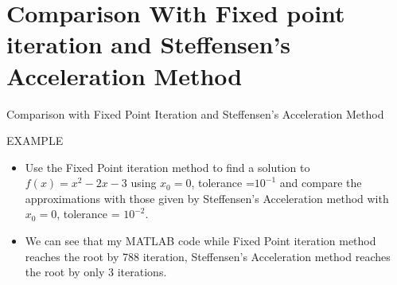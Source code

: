 \documentclass{beamer}
\begin{document}
\section{Comparison With Fixed point iteration and Steffensen's Acceleration Method}
\begin{frame}{Comparison with Fixed Point Iteration and Steffensen's Acceleration Method}
\begin{block}{EXAMPLE}
\begin{itemize}


\item[]<1-> Use the Fixed Point iteration method to find a solution to $f(x) = x^2-2x-3$ using $x_0=0$, tolerance =$10^{-1}$ and compare the approximations with those given by Steffensen's Acceleration method with $x_0=0$, tolerance = $10^{-2}$.
\item<2-> We can see that my MATLAB code while  Fixed Point iteration method reaches the root by 788 iteration, Steffensen's Acceleration method reaches the root by only 3 iterations. 
\end{itemize}

\end{block}

\end{frame}
\end{document}
